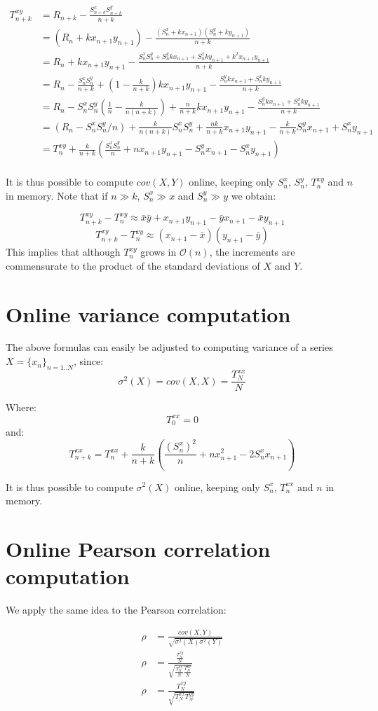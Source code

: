 \documentclass[12pt]{article}
\begin{document}
\begin{align*}
T^{xy}_{n+k} &= R_{n+k} - \frac{S_{n+k}^xS_{n+k}^y}{n+k} \\
&= (R_n + kx_{n+1}y_{n+1}) - \frac{(S_n^x + kx_{n+1})(S_n^y+ky_{n+1})}{n+k} \\
&= R_n + kx_{n+1}y_{n+1} - \frac{S_n^xS_n^y + S_n^ykx_{n+1} + S_n^xky_{n+1} + k^2x_{n+1}y_{n+1}}{n+k} \\
&= R_n - \frac{S_n^xS_n^y}{n+k} + \left(1 - \frac{k}{n+k}\right)kx_{n+1}y_{n+1} - \frac{S_n^ykx_{n+1} + S_n^xky_{n+1}}{n+k}\\
&= R_n - S_n^xS_n^y\left(\frac{1}{n}-\frac{k}{n(n+k)}\right) +\frac{n}{n+k}kx_{n+1}y_{n+1} - \frac{S_n^ykx_{n+1} + S_n^xky_{n+1}}{n+k}\\
&= \left(R_n - S_n^xS_n^y/n\right) + \frac{k}{n(n+k)}S_n^xS_n^y +\frac{nk}{n+k}x_{n+1}y_{n+1} - \frac{k}{n+k}S_n^yx_{n+1} + S_n^xy_{n+1}\\
&= T^{xy}_n + \frac{k}{n+k}\left(\frac{S_n^xS_n^y}{n} +nx_{n+1}y_{n+1} - S_n^yx_{n+1} - S_n^xy_{n+1}\right)\\
\end{align*}

It is thus possible to compute $cov(X,Y)$ online, keeping only $S_n^x$, $S_n^y$, $T^{xy}_n$ and $n$ in memory. Note that if $n \gg k$, $S_n^x \gg x$ and $S_n^y \gg y$ we obtain:

$$T^{xy}_{n+k} - T^{xy}_n \approx \bar{x}\bar{y} +x_{n+1}y_{n+1} - \bar{y}x_{n+1} - \bar{x}y_{n+1} $$
$$T^{xy}_{n+k} - T^{xy}_n \approx (x_{n+1} - \bar{x})(y_{n+1} - \bar{y}) $$
This implies that although $T^{xy}_{n}$ grows in $\mathcal{O}(n)$, the increments are commensurate to the product of the standard deviations of $X$ and $Y$.

\section{Online variance computation}

The above formulas can easily be adjusted to computing variance of a series $X = \{x_n\}_{n=1..N}$, since: 
$$\sigma^2(X)=cov(X,X)=\frac{T^{xx}_N}{N}$$

Where: 
$$T^{xx}_0 = 0$$
and:
$$T^{xx}_{n+k} = T^{xx}_n + \frac{k}{n+k}\left(\frac{\left(S_n^x\right)^2}{n} +nx_{n+1}^2 - 2S_n^xx_{n+1}\right)$$

It is thus possible to compute $\sigma^2(X)$ online, keeping only $S_n^x$, $T^{xx}_n$ and $n$ in memory.

\section{Online Pearson correlation computation}

We apply the same idea to the Pearson correlation: 

\begin{align*}
\rho &= \frac{cov(X,Y)}{\sqrt{\sigma^2(X)\sigma^2(Y)}} \\
\rho &= \frac{\frac{T^{xy}_N}{N}}{\sqrt{\frac{T^{xx}_N}{N}\frac{T^{yy}_N}{N}}} \\
\rho &= \frac{T^{xy}_N}{\sqrt{T^{xx}_NT^{yy}_N}}
\end{align*}
\end{document}
